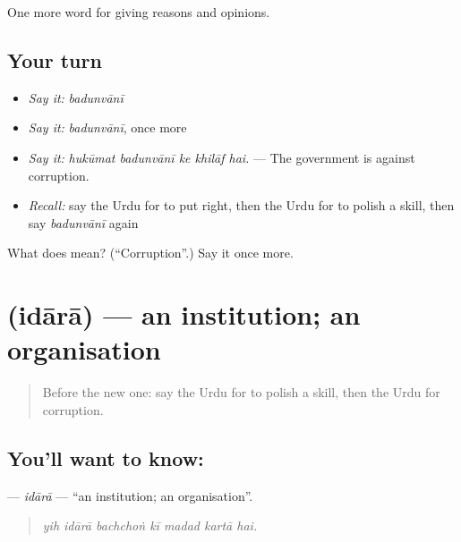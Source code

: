 \begin{grammarlens}[title={What you've built}]
One more word for giving reasons and opinions.
\end{grammarlens}

\subsection*{Your turn}
\begin{itemize}
\raggedright
  \item \emph{Say it:} \emph{badunvānī}
  \item \emph{Say it:} \emph{badunvānī}, once more
  \item \emph{Say it:} \emph{hukūmat badunvānī ke khilāf hai.} — The government is against corruption.
  \item \emph{Recall:} say the Urdu for to put right, then the Urdu for to polish a skill, then say \emph{badunvānī} again
\end{itemize}

\begin{tcolorbox}[breakable,colback=teal!4,colframe=teal!35!black,title={Before you move on}]
What does  mean? (\textquotedblleft{}Corruption\textquotedblright{}.) Say it once more.
\end{tcolorbox}
\section[\texorpdfstring{\ur{ادارہ} (idārā)}{ادارہ (idārā)}]{ (idārā) — an institution; an organisation}

\label{lesson:UR-C357-idara}



\begin{quote}
Before the new one: say the Urdu for to polish a skill, then the Urdu for corruption.
\end{quote}

\subsection*{You'll want to know: }
\textbf{} — \emph{idārā} — \textquotedblleft{}an institution; an organisation\textquotedblright{}.

\begin{quote}
      
\end{quote}

\begin{quote}
\emph{yih idārā bachchoṅ kī madad kartā hai.}
\end{quote}

